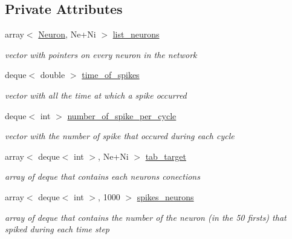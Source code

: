 \subsection*{Private Attributes}
\begin{DoxyCompactItemize}
\item 
\mbox{\label{class_network_a6c1b05b81fbc7f3c8b47dc4f26209aca}} 
array$<$ \hyperlink{class_neuron}{Neuron}, Ne+Ni $>$ \hyperlink{class_network_a6c1b05b81fbc7f3c8b47dc4f26209aca}{list\+\_\+neurons}
\begin{DoxyCompactList}\small\item\em vector with pointers on every neuron in the network \end{DoxyCompactList}\item 
\mbox{\label{class_network_a1e898ef4c94a844087396defe47746c4}} 
deque$<$ double $>$ \hyperlink{class_network_a1e898ef4c94a844087396defe47746c4}{time\+\_\+of\+\_\+spikes}
\begin{DoxyCompactList}\small\item\em vector with all the time at which a spike occurred \end{DoxyCompactList}\item 
\mbox{\label{class_network_a05cf85067b1fa474657e1037fa04990d}} 
deque$<$ int $>$ \hyperlink{class_network_a05cf85067b1fa474657e1037fa04990d}{number\+\_\+of\+\_\+spike\+\_\+per\+\_\+cycle}
\begin{DoxyCompactList}\small\item\em vector with the number of spike that occured during each cycle \end{DoxyCompactList}\item 
\mbox{\label{class_network_a4f09c296195bc891346c6fd75e40de70}} 
array$<$ deque$<$ int $>$, Ne+Ni $>$ \hyperlink{class_network_a4f09c296195bc891346c6fd75e40de70}{tab\+\_\+target}
\begin{DoxyCompactList}\small\item\em array of deque that contains each neuron\textquotesingle{}s conections \end{DoxyCompactList}\item 
\mbox{\label{class_network_afa1f43d10de7ca659825149645d56028}} 
array$<$ deque$<$ int $>$, 1000 $>$ \hyperlink{class_network_afa1f43d10de7ca659825149645d56028}{spikes\+\_\+neurons}
\begin{DoxyCompactList}\small\item\em array of deque that contains the number of the neuron (in the 50 firsts) that spiked during each time step \end{DoxyCompactList}\end{DoxyCompactItemize}


